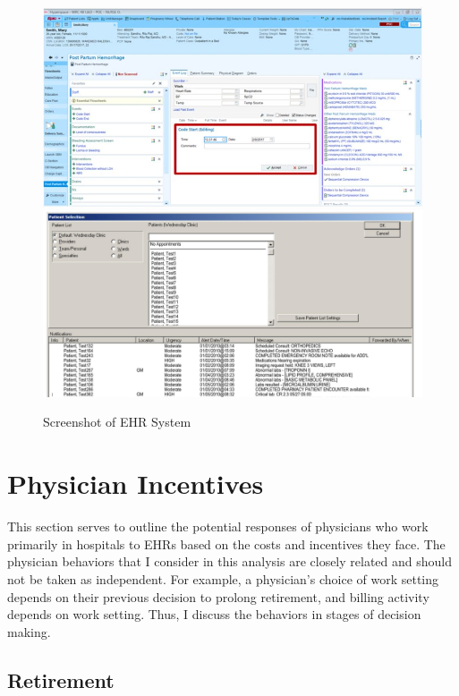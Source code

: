 \documentclass[11pt]{article}
\begin{document}
\begin{figure}[ht]
    \centering
    \captionsetup{width=.4\linewidth}
    \caption{Screenshot of EHR System}
    \includegraphics[scale=.4]{Objects/epic-ehr-screenshot.jpg}
    \includegraphics[scale=.115]{Objects/EHRimage2.jpg}
    \label{fig:EPIC}
\end{figure}


\section{Physician Incentives}

This section serves to outline the potential responses of physicians who work primarily in hospitals to EHRs based on the costs and incentives they face. The physician behaviors that I consider in this analysis are closely related and should not be taken as independent. For example, a physician's choice of work setting depends on their previous decision to prolong retirement, and billing activity depends on work setting. Thus, I discuss the behaviors in stages of decision making. 

\subsection{Retirement}
\end{document}
